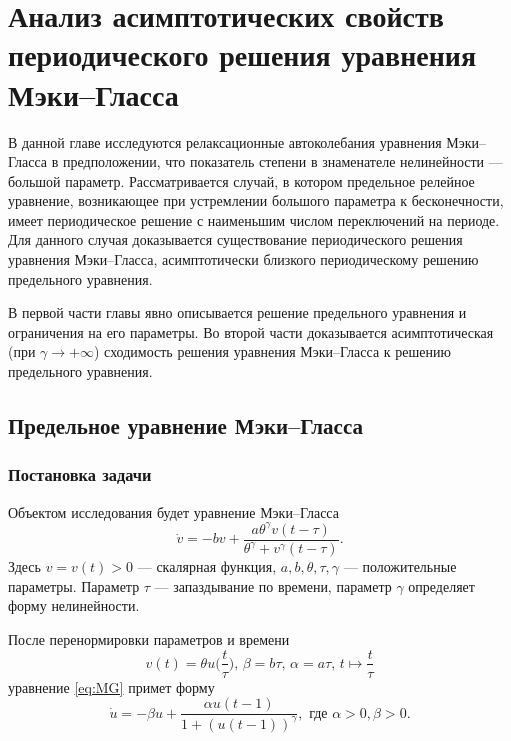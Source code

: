 \chapter{Анализ асимптотических свойств периодического решения уравнения Мэки--Гласса}\label{ch:ch1}

В данной главе исследуются релаксационные автоколебания уравнения Мэки--Гласса в предположении, что показатель степени в знаменателе нелинейности --- большой параметр. Рассматривается случай, в котором предельное релейное уравнение, возникающее при устремлении большого параметра к бесконечности, имеет периодическое решение с наименьшим числом переключений на периоде. Для данного случая доказывается существование периодического решения уравнения Мэки--Гласса, асимптотически близкого периодическому решению предельного уравнения.

В первой части главы явно описывается решение предельного уравнения и ограничения на его параметры. Во второй части доказывается асимптотическая (при $\gamma \to +\infty$) сходимость решения уравнения Мэки--Гласса к решению предельного уравнения.

\section{Предельное уравнение Мэки--Гласса}\label{sec:ch1/sec1}

\subsection{Постановка задачи}

Объектом исследования будет уравнение Мэки--Гласса 
\cite{Mackey1977, Glass1988}
\begin{equation}
\label{eq:MG}
\dot{v}=-b v+\frac{a \theta^{\gamma} v(t-\tau)}{\theta^{\gamma}+v^{\gamma}(t-\tau)}.
\end{equation}
Здесь $v=v(t) > 0$ --- скалярная функция, $a, b, \theta, \tau, \gamma$ --- положительные параметры. Параметр $\tau$ --- запаздывание по времени, параметр $\gamma$ определяет форму нелинейности.

После перенормировки параметров и времени
\begin{equation}
\label{eq:substitutions_v}
v(t) = \theta u\Big(\frac{t}{\tau}\Big),\, \beta = b\tau,\, \alpha=a\tau, \, t \mapsto \frac{t}{\tau}
\end{equation}
уравнение \eqref{eq:MG} примет форму
\begin{equation}
\label{eq:MG_norm}
    \dot{u}=-\beta u+\frac{\alpha u(t-1)}{1+(u(t-1))^\gamma}, \text{ где } \alpha > 0, \beta > 0.
\end{equation}

